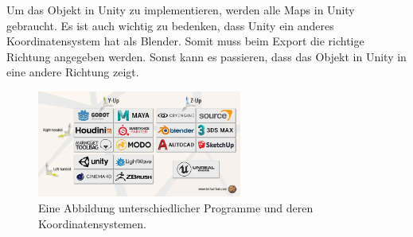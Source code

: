 Um das Objekt in Unity zu implementieren, werden alle Maps in Unity gebraucht. Es ist auch wichtig zu bedenken, dass Unity ein anderes Koordinatensystem hat als Blender. Somit muss beim Export die richtige Richtung angegeben werden. Sonst kann es passieren, dass das Objekt in Unity in eine andere Richtung zeigt.

\begin{figure}[H]
    \centering
    \includegraphics[width=0.6\textwidth]{chapters/11/Images/Koordinaten.png}
    \caption{Eine Abbildung unterschiedlicher Programme und deren Koordinatensystemen.}
    \label{htl01}
\end{figure}

\pagebreak